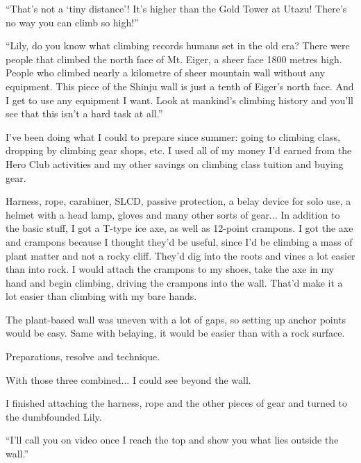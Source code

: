 ``That's not a `tiny distance'! It's higher than the Gold Tower at Utazu! There's no way you can climb so high!''

``Lily, do you know what climbing records humans set in the old era? There were people that climbed the north face of Mt. Eiger, a sheer face 1800 metres high. People who climbed nearly a kilometre of sheer mountain wall without any equipment. This piece of the Shinju wall is just a tenth of Eiger's north face. And I get to use any equipment I want. Look at mankind's climbing history and you'll see that this isn't a hard task at all.''

I've been doing what I could to prepare since summer: going to climbing class, dropping by climbing gear shops, etc. I used all of my money I'd earned from the Hero Club activities and my other savings on climbing class tuition and buying gear.

Harness, rope, carabiner, SLCD, passive protection, a belay device for solo use, a helmet with a head lamp, gloves and many other sorts of gear... In addition to the basic stuff, I got a T-type ice axe, as well as 12-point crampons. I got the axe and crampons because I thought they'd be useful, since I'd be climbing a mass of plant matter and not a rocky cliff. They'd dig into the roots and vines a lot easier than into rock. I would attach the crampons to my shoes, take the axe in my hand and begin climbing, driving the crampons into the wall. That'd make it a lot easier than climbing with my bare hands.

The plant-based wall was uneven with a lot of gaps, so setting up anchor points would be easy. Same with belaying, it would be easier than with a rock surface.

Preparations, resolve and technique.

With those three combined... I could see beyond the wall.

I finished attaching the harness, rope and the other pieces of gear and turned to the dumbfounded Lily.

``I'll call you on video once I reach the top and show you what lies outside the wall.''

